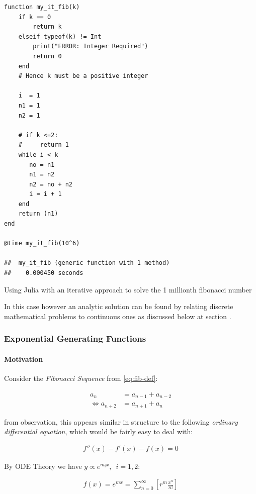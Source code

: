 \documentclass[11pt]{article}
\begin{document}
\begin{listing}[htbp]
\begin{verbatim}
function my_it_fib(k)
    if k == 0
        return k
    elseif typeof(k) != Int
        print("ERROR: Integer Required")
        return 0
    end
    # Hence k must be a positive integer

    i  = 1
    n1 = 1
    n2 = 1

    # if k <=2:
    #     return 1
    while i < k
       no = n1
       n1 = n2
       n2 = no + n2
       i = i + 1
    end
    return (n1)
end

@time my_it_fib(10^6)

##  my_it_fib (generic function with 1 method)
##    0.000450 seconds
\end{verbatim}
\caption{\label{julia-fib}Using Julia with an iterative approach to solve the 1 millionth fibonacci number}
\end{listing}

In this case however an analytic solution can be found by relating discrete
mathematical problems to continuous ones as discussed below at section .
\subsubsection{Exponential Generating Functions}
\label{exp-gen-func-fib-seq}
\paragraph{Motivation}
\label{motivation}
Consider the \emph{Fibonacci Sequence} from \eqref{eq:fib-def}:


\begin{align}
    a_{n}&= a_{n - 1} + a_{n - 2} \nonumber \\
\iff a_{n+  2} &= a_{n+  1} +  a_n \label{eq:fib-def-shift}
\end{align}


from observation, this appears similar in structure to the following \emph{ordinary
differential equation}, which would be fairly easy to deal with:


\begin{align*}
f''\left( x \right)- f'\left( x \right)- f\left( x \right)=  0
\end{align*}

By ODE Theory we have \(y \propto e^{m_{i}x}, \enspace i = 1, 2\):

\begin{align*}
f\left( x \right)= e^{mx} = \sum^{\infty}_{n= 0}   \left[ r^{m} \frac{x^n}{n!} \right]
\end{align*}
\end{document}
